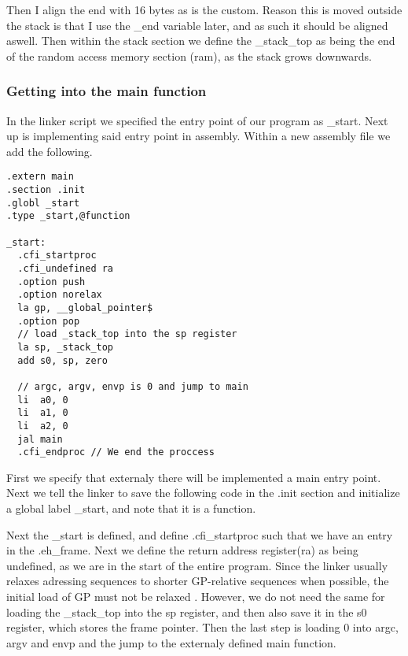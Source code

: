 Then I align the end with 16 bytes as is the custom. Reason this is moved outside the stack
is that I use the \_end variable later, and as such it should be aligned aswell.
Then within the stack section we define the \_stack\_top as being the end of the random access
memory section (ram), as the stack grows downwards.

\subsubsection{Getting into the main function}
In the linker script we specified the entry point of our program as \_start. Next up
is implementing said entry point in assembly. Within a new assembly file we add the following.
\begin{lstlisting}
.extern main
.section .init
.globl _start
.type _start,@function

_start:
  .cfi_startproc
  .cfi_undefined ra
  .option push
  .option norelax
  la gp, __global_pointer$
  .option pop
  // load _stack_top into the sp register
  la sp, _stack_top
  add s0, sp, zero

  // argc, argv, envp is 0 and jump to main
  li  a0, 0
  li  a1, 0
  li  a2, 0
  jal main
  .cfi_endproc // We end the proccess
\end{lstlisting}
First we specify that externaly there will be implemented a main entry point. Next we tell the
linker to save the following code in the .init section and initialize a global label \_start,
and note that it is a function.

Next the \_start is defined, and define .cfi\_startproc such that we have an entry in the
.eh\_frame. Next we define the return address register(ra) as being undefined, as we are in
the start of the entire program. Since the linker usually relaxes adressing sequences to
shorter GP-relative sequences when possible, the initial load of GP must not be relaxed
\cite{GNU_BIN}. However, we do not need the same for loading the \_stack\_top into the sp
register, and then also save it in the s0 register, which stores the frame pointer.
Then the last step is loading 0 into argc, argv and envp and the jump to the externaly
defined main function.

